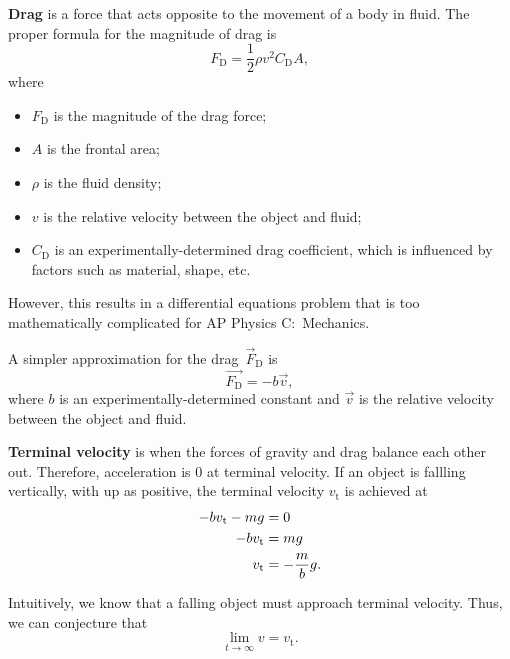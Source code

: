 \textbf{Drag} is a force that acts opposite to the movement of a body in fluid.
The proper formula for the magnitude of drag is
\begin{equation}
    F_\mathrm{D} = \frac{1}{2} \rho v^2 C_\mathrm{D} A,
\end{equation}
where
\begin{itemize}
    \item \(F_\mathrm{D}\) is the magnitude of the drag force;
    \item \(A\) is the frontal area;
    \item \(\rho\) is the fluid density;
    \item \(v\) is the relative velocity between the object and fluid;
    \item \(C_\mathrm{D}\) is an experimentally-determined drag coefficient,
        which is influenced by factors such as material, shape, etc.
\end{itemize}
However, this results in a differential equations problem
that is too mathematically complicated for AP Physics C:~Mechanics.

A simpler approximation for the drag~\(\vec{F}_\mathrm{D}\) is
\begin{equation} \label{eq:linear-drag}
    \vec{F_\mathrm{D}} = - b \vec{v},
\end{equation}
where \(b\) is an experimentally-determined constant
and \(\vec{v}\) is the relative velocity between the object and fluid.

\textbf{Terminal velocity} is when the forces of gravity and drag
balance each other out.
Therefore, acceleration is 0 at terminal velocity.
If an object is fallling vertically, with up as positive,
the terminal velocity \(v_\mathrm{t}\) is achieved at
\begin{equation} \label{eq:linear-terminal-velocity}
    \begin{aligned}
        - b v_\mathrm{t} - m g &= 0 \\
        - b v_\mathrm{t} &= m g \\
        v_\mathrm{t} &= - \frac{m}{b} g. \\
    \end{aligned} \\
\end{equation}

Intuitively, we know that a falling object must approach terminal velocity.
Thus, we can conjecture that
\begin{equation} \label{eq:terminal-velocity-limit}
    \lim_{t \to \infty} v = v_\mathrm{t}.
\end{equation}

